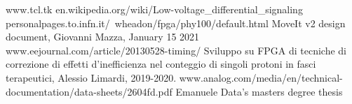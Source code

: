\begin{thebibliography}{00}
	www.tcl.tk
	en.wikipedia.org/wiki/Low-voltage\_differential\_signaling
	personalpages.to.infn.it/~wheadon/fpga/phy100/default.html
	MoveIt v2 design document, Giovanni Mazza, January 15 2021
	www.eejournal.com/article/20130528-timing/
	Sviluppo su FPGA di tecniche di correzione di effetti d'inefficienza nel conteggio di singoli protoni in fasci terapeutici, Alessio Limardi, 2019-2020.
	www.analog.com/media/en/technical-documentation/data-sheets/2604fd.pdf
	Emanuele Data's masters degree thesis 
	
	
\end{thebibliography}
